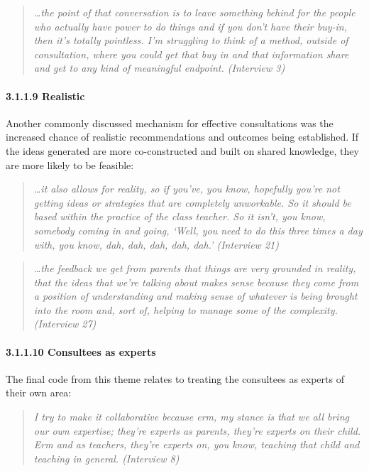 \documentclass[
  english,
  man]{apa}
\let\oldparagraph\paragraph
\renewcommand{\paragraph}[1]{\oldparagraph{#1}\mbox{}}
\begin{document}
\begin{quote}
\emph{\ldots the point of that conversation is to leave something behind for the
people who actually have power to do things and if you don't have
their buy-in, then it's totally pointless. I'm struggling to think of
a method, outside of consultation, where you could get that buy in and
that information share and get to any kind of meaningful endpoint.
(Interview 3)}
\end{quote}

\hypertarget{realistic}{%
\paragraph{3.1.1.9 Realistic}\label{realistic}}

Another commonly discussed mechanism for effective consultations was the increased chance of realistic recommendations and outcomes being established. If the ideas generated are more co-constructed and built on shared knowledge, they are more likely to be feasible:

\begin{quote}
\emph{\ldots it also allows for reality, so if you've, you know, hopefully you're
not getting ideas or strategies that are completely unworkable. So it
should be based within the practice of the class teacher. So it isn't,
you know, somebody coming in and going, `Well, you need to do this
three times a day with, you know, dah, dah, dah, dah, dah.' (Interview
21)}
\end{quote}

\begin{quote}
\emph{\ldots the feedback we get from parents that things are very grounded in
reality, that the ideas that we're talking about makes sense because
they come from a position of understanding and making sense of
whatever is being brought into the room and, sort of, helping to
manage some of the complexity. (Interview 27)}
\end{quote}

\hypertarget{consultees-as-experts}{%
\paragraph{3.1.1.10 Consultees as experts}\label{consultees-as-experts}}

The final code from this theme relates to treating the consultees as experts of their own area:

\begin{quote}
\emph{I try to make it collaborative because erm, my stance is that we all
bring our own expertise; they're experts as parents, they're experts
on their child. Erm and as teachers, they're experts on, you know,
teaching that child and teaching in general. (Interview 8)}
\end{quote}
\end{document}
